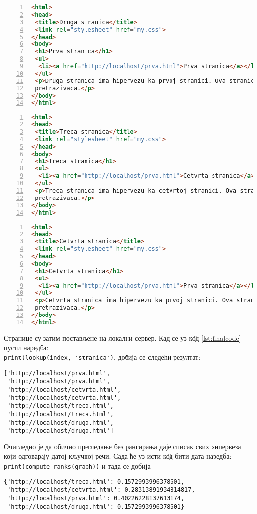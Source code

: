 \begin{lstlisting}[language=HTML, caption=K\^{о}д друге странице, label={lst:druga}, numbers=left]
<html>
<head>
 <title>Druga stranica</title>
 <link rel="stylesheet" href="my.css">
</head>
<body>
 <h1>Prva stranica</h1>
 <ul>
  <li><a href="http://localhost/prva.html">Prva stranica</a></li>
 </ul>
 <p>Druga stranica ima hipervezu ka prvoj stranici. Ova stranica se realizuje u cilju testiranja veb
 pretrazivaca.</p>
</body>
</html>
\end{lstlisting}%
\medskip
\pagebreak
\begin{lstlisting}[language=HTML, caption=K\^{о}д треће странице, label={lst:treca}, numbers=left]
<html>
<head>
 <title>Treca stranica</title>
 <link rel="stylesheet" href="my.css">
</head>
<body>
 <h1>Treca stranica</h1>
 <ul>
  <li><a href="http://localhost/prva.html">Cetvrta stranica</a></li>
 </ul>
 <p>Treca stranica ima hipervezu ka cetvrtoj stranici. Ova stranica se realizuje u cilju testiranja veb
 pretrazivaca.</p>
</body>
</html>
\end{lstlisting}%
\medskip
\begin{lstlisting}[language=HTML, caption=K\^{о}д четврте странице, label={lst:prva}, numbers=left]
<html>
<head>
 <title>Cetvrta stranica</title>
 <link rel="stylesheet" href="my.css">
</head>
<body>
 <h1>Cetvrta stranica</h1>
 <ul>
  <li><a href="http://localhost/prva.html">Prva stranica</a></li>
 </ul>
 <p>Cetvrta stranica ima hipervezu ka prvoj stranici. Ova stranica se realizuje u cilju testiranja veb
 pretrazivaca.</p>
</body>
</html>
\end{lstlisting}%
\medskip
Странице су затим постављене на локални сервер. Кад се уз к\^{о}д \ref{lst:finalcode} пусти наредба:\\
\lstinline{print(lookup(index, 'stranica')}, добија се следећи резултат:
\begin{lstlisting}
['http://localhost/prva.html',
 'http://localhost/prva.html',
 'http://localhost/cetvrta.html',
 'http://localhost/cetvrta.html',
 'http://localhost/treca.html',
 'http://localhost/treca.html',
 'http://localhost/druga.html',
 'http://localhost/druga.html']
\end{lstlisting}
Очигледно је да обично прегледање без рангирања даје списак свих хипервеза који одговарају датој кључној речи.
\pagebreak
Сада ће уз исти к\^{о}д бити дата наредба:\\
\lstinline{print(compute_ranks(graph))} и тада се добија
\begin{lstlisting}
{'http://localhost/treca.html': 0.1572993996378601,
 'http://localhost/cetvrta.html': 0.28313891934814817,
 'http://localhost/prva.html': 0.40226228137613174,
 'http://localhost/druga.html': 0.1572993996378601}
\end{lstlisting}
